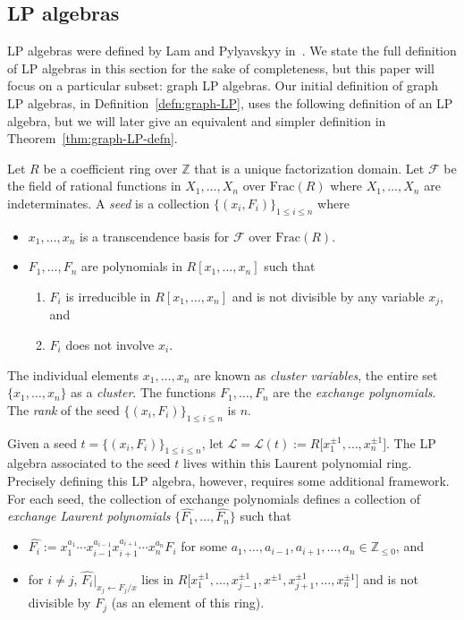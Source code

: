 \documentclass[10pt,a4paper]{amsart}
\numberwithin{equation}{section}
\newcommand{\Z}{\mathbb{Z}}
\begin{document}
\subsection{LP algebras}\label{sec:LP}
LP algebras were defined by Lam and Pylyavskyy in~\cite{LP-12}. We state the full definition of LP algebras in this section for the sake of completeness, but this paper will focus on a particular subset: graph LP algebras. Our initial definition of graph LP algebras, in Definition~\ref{defn:graph-LP}, uses the following definition of an LP algebra, but we will later give an equivalent and simpler definition in Theorem~\ref{thm:graph-LP-defn}.
\begin{Definition}[{cf.\ \cite[Section~2.1]{LP-12}}]
\label{defn:LP-alg}
Let $R$ be a coefficient ring over $\Z$ that is a unique factorization domain. Let $\mathcal{F}$ be the field of rational functions in $X_1,\dots,X_n$ over $\text{Frac}(R)$ where $X_1,\dots,X_n$ are indeterminates. A \emph{seed} is a collection $\{(x_i,F_i)\}_{1\leq i\leq n}$ where
\begin{itemize}\itemsep=0pt
 \item $x_1,\dots,x_n$ is a transcendence basis for $\mathcal{F}$ over $\text{Frac}(R)$.
 \item $F_1,\dots, F_n$ are polynomials in $R[x_1,\dots,x_n]$ such that
 \begin{enumerate}\itemsep=0pt
 \item[(LP1)] $F_i$ is irreducible in $R[x_1,\dots,x_n]$ and is not divisible by any variable $x_j$, and
 \item[(LP2)] $F_i$ does not involve $x_i$.
 \end{enumerate}
\end{itemize}
The individual elements $x_1, \dots, x_n$ are known as \emph{cluster variables}, the entire set $\{ x_1, \dots, x_n \}$ as a \emph{cluster}. The functions $F_1,\dots,F_n$ are the \emph{exchange polynomials}. The \emph{rank} of the seed $\{ (x_i, F_i) \}_{1 \leq i \leq n}$ is $n$.
\end{Definition}
Given a seed $t = \{(x_i,F_i)\}_{1\leq i\leq n}$, let $ \mathcal{L} = \mathcal{L}(t) := R\big[x_1^{\pm 1}, \dots, x_n^{\pm 1}\big]$. The LP algebra associated to the seed $t$ lives within this Laurent polynomial ring. Precisely defining this LP algebra, however, requires some additional framework.
For each seed, the collection of exchange polynomials defines a collection of \emph{exchange Laurent polynomials} $\{ \hat{F_1}, \dots, \hat{F_n} \}$ such that
\begin{itemize}\itemsep=0pt
 \item $\hat{F_i} := x_1^{a_1} \cdots x_{i-1}^{a_{i-1}}x_{i+1}^{a_{i+1}}\cdots x_n^{a_n}F_i$ for some $a_1, \dots, a_{i-1},a_{i+1},\dots,a_n \in \mathbb{Z}_{\leq 0}$, and
 \item for $i \neq j$, $\hat{F_i}\big|_{x_j \leftarrow F_j/x}$ lies in $R\big[x_1^{\pm 1}, \dots, x_{j-1}^{\pm 1},x^{\pm 1}, x_{j+1}^{\pm 1}, \dots, x_n^{\pm 1}\big]$ and is not divisible by $F_j$ (as an element of this ring).
\end{itemize}
\end{document}
